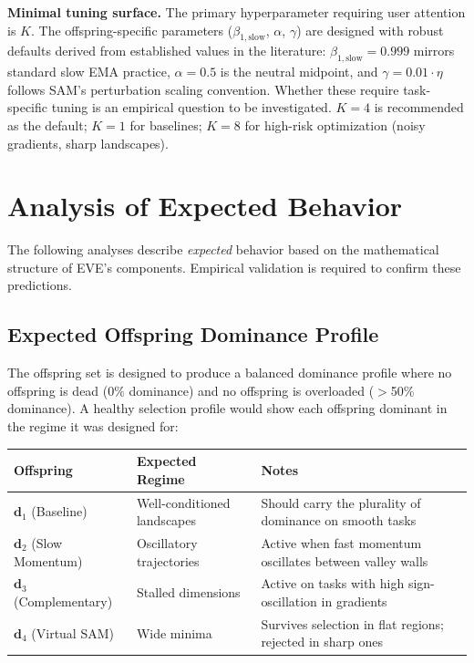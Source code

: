 \documentclass[12pt]{article}
\newcommand{\warnbox}[1]{%
  \begin{tcolorbox}[warnstyle]
    #1
  \end{tcolorbox}
}
\begin{document}
\warnbox{%
\textbf{Minimal tuning surface.}
The primary hyperparameter requiring user attention is $K$.
The offspring-specific parameters ($\beta_{1,\mathrm{slow}}$, $\alpha$,
$\gamma$) are designed with robust defaults derived from established
values in the literature: $\beta_{1,\mathrm{slow}} = 0.999$ mirrors
standard slow EMA practice, $\alpha = 0.5$ is the neutral midpoint,
and $\gamma = 0.01 \cdot \eta$ follows SAM's perturbation scaling
convention.
Whether these require task-specific tuning is an empirical question to
be investigated.
$K = 4$ is recommended as the default; $K = 1$ for baselines;
$K = 8$ for high-risk optimization (noisy gradients, sharp landscapes).
}


\section{Analysis of Expected Behavior}
\label{sec:analysis}

The following analyses describe \emph{expected} behavior based on the
mathematical structure of EVE's components.
Empirical validation is required to confirm these predictions.

\subsection{Expected Offspring Dominance Profile}

The offspring set is designed to produce a balanced dominance
profile where no offspring is dead (0\% dominance) and no offspring
is overloaded ($>$50\% dominance).
A healthy selection profile would show each offspring dominant
in the regime it was designed for:

\begin{center}
\small
\begin{tabular}{@{}llp{8cm}@{}}
  \toprule
  Offspring & Expected Regime & Notes \\
  \midrule
  $\mathbf{d}_1$ (Baseline)
    & Well-conditioned landscapes
    & Should carry the plurality of dominance on smooth tasks \\
  $\mathbf{d}_2$ (Slow Momentum)
    & Oscillatory trajectories
    & Active when fast momentum oscillates between valley walls \\
  $\mathbf{d}_3$ (Complementary)
    & Stalled dimensions
    & Active on tasks with high sign-oscillation in gradients \\
  $\mathbf{d}_4$ (Virtual SAM)
    & Wide minima
    & Survives selection in flat regions; rejected in sharp ones \\
  \bottomrule
\end{tabular}
\end{center}
\end{document}
